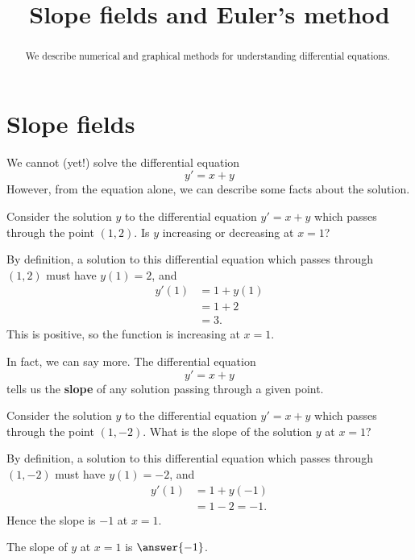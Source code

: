 \documentclass{ximera}
\title[Dig-In:]{Slope fields and Euler's method}
\begin{document}
\begin{abstract}
We describe numerical and graphical methods for understanding
differential equations.
\end{abstract}
\maketitle


\section{Slope fields}

We cannot (yet!) solve the differential equation
\[
y' = x+y
\]
However, from the equation alone, we can describe some facts about the
solution.

\begin{question}
  Consider the solution $y$ to the differential equation $y'=x+y$
  which passes through the point $(1,2)$.  Is $y$ increasing or
  decreasing at $x=1$?
  \begin{prompt}
  \begin{multipleChoice}
  \end{multipleChoice}
  \end{prompt}
  \begin{hint}
    By definition, a solution to this differential equation which
    passes through $(1,2)$ must have $y(1)=2$, and
    \begin{align*}
      y'(1) &= 1+y(1)\\
      &=1+2\\
      &=3.
    \end{align*}
    This is positive, so the function is increasing at $x=1$.
  \end{hint}
\end{question}
In fact, we can say more. The differential equation
\[
y' = x+y
\]
tells us the \textbf{slope} of any solution passing through a given
point.
\begin{question}
  Consider the solution $y$ to the differential equation $y'=x+y$
  which passes through the point $(1,-2)$. What is the slope of the
  solution $y$ at $x=1?$
    \begin{hint}
    By definition, a solution to this differential equation which
    passes through $(1,-2)$ must have $y(1)=-2$, and
    \begin{align*}
      y'(1) &= 1+y(-1)\\
      &= 1-2=-1.
    \end{align*}
    Hence the slope is $-1$ at $x=1$.
    \end{hint}
    \begin{prompt}
      The slope of $y$ at $x=1$ is $\answer{-1}$.
    \end{prompt}
\end{question}
\end{document}

